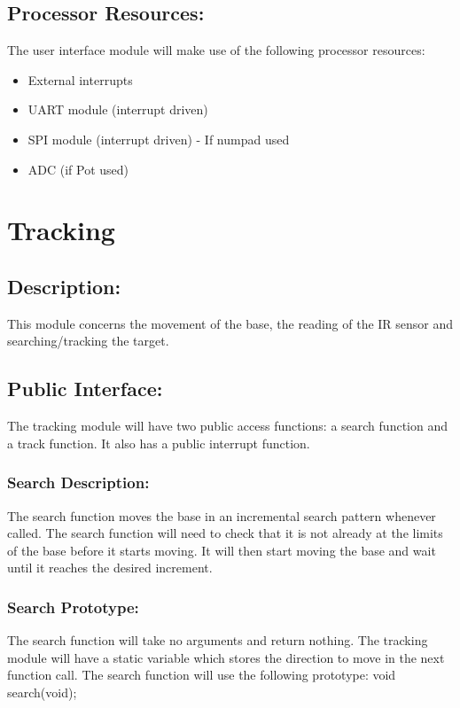 \documentclass[]{article}
\begin{document}
\subsection{Processor Resources:}
The user interface module will make use of the following processor resources:
\begin{itemize}
	\item External interrupts
	\item UART module (interrupt driven)
	\item SPI module (interrupt driven) - If numpad used
	\item ADC (if Pot used)
\end{itemize}

\newpage
\section{Tracking}

\subsection{Description:}
This module concerns the movement of the base, the reading of the IR sensor and searching/tracking the target.

\subsection{Public Interface:}
The tracking module will have two public access functions: a search function and a track function. It also has a public interrupt function.

\subsubsection{Search Description:}
The search function moves the base in an incremental search pattern whenever called. The search function will need to check that it is not already at the limits of the base before it starts moving. It will then start moving the base and wait until it reaches the desired increment.

\subsubsection{Search Prototype:}
The search function will take no arguments and return nothing. The tracking module will have a static variable which stores the direction to move in the next function call. The search function will use the following prototype: \newline \newline
void search(void);
\end{document}
